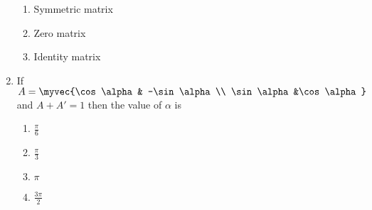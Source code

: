 \begin{enumerate}
\begin{enumerate}
\item Symmetric matrix
\item Zero matrix
\item Identity matrix
\end{enumerate}
\item If $A=\myvec{\cos \alpha& -\sin \alpha \\ \sin \alpha &\cos \alpha}$ and $A+A'=1$ then the value of $\alpha$ is
\begin{enumerate}
\item $\frac{\pi}{6}$
\item $\frac{\pi}{3}$
\item $\pi$
\item $\frac{3\pi}{2}$
\end{enumerate}  
\end{enumerate}

